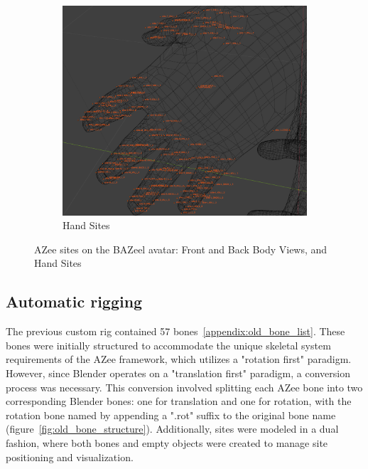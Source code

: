 \documentclass[../../main.tex]{subfiles}
\begin{document}
\begin{figure}[h]
\begin{subfigure}[b]{0.3\textwidth}
        \includegraphics[width=\textwidth]{chapters/rigging_layers/images/sites_hand.png}
        \caption{Hand Sites}
        \label{fig:sites_hand}
    \end{subfigure}
    \caption{AZee sites on the BAZeel avatar: Front and Back Body Views, and Hand Sites}
    \label{fig:sites_bazeel_combined}
\end{figure}

\subsection{Automatic rigging}
\label{ch:rigging_layers:proc_rig_signing_avatars:auto_rig}

The previous custom rig contained 57 bones~\ref{appendix:old_bone_list}. These bones were initially structured to accommodate the unique skeletal system requirements of the AZee framework, which utilizes a "rotation first" paradigm. However, since Blender operates on a "translation first" paradigm, a conversion process was necessary. This conversion involved splitting each AZee bone into two corresponding Blender bones: one for translation and one for rotation, with the rotation bone named by appending a ".rot" suffix to the original bone name (figure~\ref{fig:old_bone_structure}). Additionally, sites were modeled in a dual fashion, where both bones and empty objects were created to manage site positioning and visualization.
\end{document}
